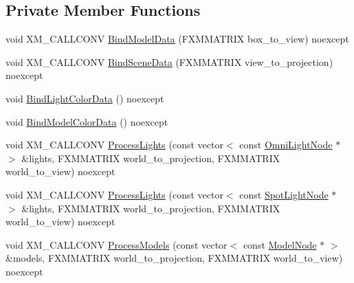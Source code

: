 \subsection*{Private Member Functions}
\begin{DoxyCompactItemize}
\item 
void X\+M\+\_\+\+C\+A\+L\+L\+C\+O\+NV \hyperlink{classmage_1_1_bounding_volume_pass_a8066f125ce3989be18f5c0392c65a228}{Bind\+Model\+Data} (F\+X\+M\+M\+A\+T\+R\+IX box\+\_\+to\+\_\+view) noexcept
\item 
void X\+M\+\_\+\+C\+A\+L\+L\+C\+O\+NV \hyperlink{classmage_1_1_bounding_volume_pass_aba0dea2c91840728e46c6bc277595b64}{Bind\+Scene\+Data} (F\+X\+M\+M\+A\+T\+R\+IX view\+\_\+to\+\_\+projection) noexcept
\item 
void \hyperlink{classmage_1_1_bounding_volume_pass_a672cc485849b0dc0263e3fda8bcfcf4f}{Bind\+Light\+Color\+Data} () noexcept
\item 
void \hyperlink{classmage_1_1_bounding_volume_pass_a41c5393f594fb7d4d778d9bf7ec93e69}{Bind\+Model\+Color\+Data} () noexcept
\item 
void X\+M\+\_\+\+C\+A\+L\+L\+C\+O\+NV \hyperlink{classmage_1_1_bounding_volume_pass_a56957ab48a5ab958d12f02c357881113}{Process\+Lights} (const vector$<$ const \hyperlink{namespacemage_a1724c6e6b6b5ba535cdd967cbbb4a669}{Omni\+Light\+Node} $\ast$ $>$ \&lights, F\+X\+M\+M\+A\+T\+R\+IX world\+\_\+to\+\_\+projection, F\+X\+M\+M\+A\+T\+R\+IX world\+\_\+to\+\_\+view) noexcept
\item 
void X\+M\+\_\+\+C\+A\+L\+L\+C\+O\+NV \hyperlink{classmage_1_1_bounding_volume_pass_ab403e4703e67be26c07ad9d8fa2586c2}{Process\+Lights} (const vector$<$ const \hyperlink{namespacemage_aeed5dee4ff6c591eabb0e9114256df4a}{Spot\+Light\+Node} $\ast$ $>$ \&lights, F\+X\+M\+M\+A\+T\+R\+IX world\+\_\+to\+\_\+projection, F\+X\+M\+M\+A\+T\+R\+IX world\+\_\+to\+\_\+view) noexcept
\item 
void X\+M\+\_\+\+C\+A\+L\+L\+C\+O\+NV \hyperlink{classmage_1_1_bounding_volume_pass_adb2273b594f0337e129c2bad8d0b8dba}{Process\+Models} (const vector$<$ const \hyperlink{classmage_1_1_model_node}{Model\+Node} $\ast$ $>$ \&models, F\+X\+M\+M\+A\+T\+R\+IX world\+\_\+to\+\_\+projection, F\+X\+M\+M\+A\+T\+R\+IX world\+\_\+to\+\_\+view) noexcept
\end{DoxyCompactItemize}
